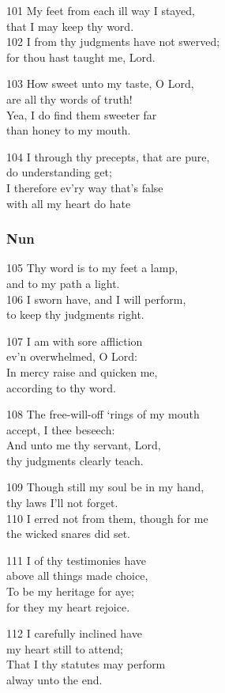 \begin{multicols}{3}
101 My feet from each ill way I stayed,\\
that I may keep thy word.\\
102 I from thy judgments have not swerved;\\
for thou hast taught me, Lord.

103 How sweet unto my taste, O Lord,\\
are all thy words of truth!\\
Yea, I do find them sweeter far\\
than honey to my mouth.

104 I through thy precepts, that are pure,\\
do understanding get;\\
I therefore ev’ry way that’s false\\
with all my heart do hate

\subsubsection*{Nun}

105 Thy word is to my feet a lamp,\\
and to my path a light.\\
106 I sworn have, and I will perform,\\
to keep thy judgments right.

107 I am with sore affliction\\
ev’n overwhelmed, O Lord:\\
In mercy raise and quicken me,\\
according to thy word.

108 The free-will-off ‘rings of my mouth\\
accept, I thee beseech:\\
And unto me thy servant, Lord,\\
thy judgments clearly teach.

109 Though still my soul be in my hand,\\
thy laws I’ll not forget.\\
110 I erred not from them, though for me\\
the wicked snares did set.

111 I of thy testimonies have\\
above all things made choice,\\
To be my heritage for aye;\\
for they my heart rejoice.

112 I carefully inclined have\\
my heart still to attend;\\
That I thy statutes may perform\\
alway unto the end.


\end{multicols}
